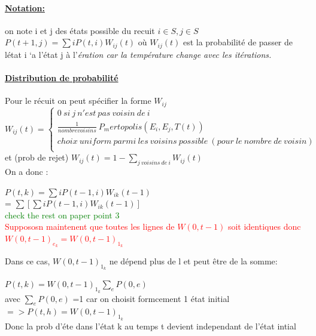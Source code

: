\paragraph{\underline{Notation:}} on note i et j des \'etats possible du recuit $ i \in S, j \in S $ \\

$P(t+1,j) = \sum{i} P(t,i)W_{ij}(t)$
o\`u $W_{ij}(t)$ est la probabilit\'e de passer de l\'etat i `a l'\'etat j \`a l'\it\'eration car la temp\'erature change avec les it\'erations.

\paragraph*{\underline{Distribution de probabilit\'e}}
Pour le r\'ecuit on peut sp\'ecifier la forme $W_{ij}$  \\
\[ W_{ij}(t)= \left\{
                \begin{array}{ll}
                  0 \ si\ j\ n'est\ pas\ voisin \ de \ i \\
                  \frac{1}{nombre voisins} \ P_mertopolis(E_i,E_j,T(t))\\
                   choix \  uniform \ parmi \ les \  voisins \ possible\  (pour\  le\  nombre \ de \ voisin)\\
                  
                  
                \end{array}
              \right.
  \]
et (prob de rejet) $W_{ij}(t) = 1-  \sum_{j\ voisins\ de\ i} W_{ij}(t) $\\
On a donc :
\begin{center}
$P(t,k) = \sum{i} P(t-1,i)W_{ik}(t-1)$ \\ 
= $\sum{[\sum{i} P(t-1,i)W_{ik}(t-1)]}$ \\
\textcolor{green}{check the rest on paper point 3}\\

\textcolor{red}{Suppososn maintenent que toutes les lignes de $ W(0,t-1) $ soit identiques donc  $ W(0,t-1)_{e_k} = W(0,t-1)_{1_k} $ }
\end{center}
Dans ce cas, $W(0,t-1)_{1_k}$ ne d\'epend plus de l et peut \^etre de la somme:
\begin{center}
$P(t,k) = W(0,t-1)_{1_k}\sum_{e}P(0,e)$  \\ avec $\sum_{e}P(0,e)$ =1 car on choisit formcement 1 \'etat initial \\ 
$=> P(t,h) = W(0,t-1)_{1_k}$ \\


Donc la prob d'\'ete dans l'\'etat k au temps t devient independant de l'\'etat intial 
\end{center}

